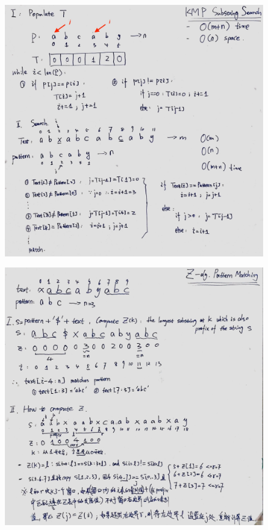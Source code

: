 \documentclass[a4paper,10pt]{article}
\begin{document}
\begin{figure}[h]
    \includegraphics[width=\textwidth]{leetcode28-1.jpg}
    \centering \\
\end{figure}

\begin{figure}[h]
    \includegraphics[width=\textwidth]{leetcode28-2.jpg}
    \centering \\
\end{figure}
\end{document}
